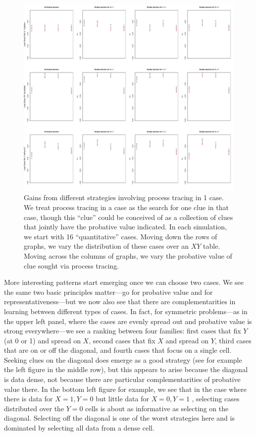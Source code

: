 \documentclass[12pt,]{book}
\begin{document}
\begin{figure}
\centering
\includegraphics{Figures/K1.pdf}
\caption{Gains from different strategies involving process tracing in 1 case. We treat process tracing in a case as the search for one clue in that case, though this ``clue'' could be conceived of as a collection of clues that jointly have the probative value indicated. In each simulation, we start with 16 ``quantitative'' cases. Moving down the rows of graphs, we vary the distribution of these cases over an \(XY\) table. Moving across the columns of graphs, we vary the probative value of clue sought via process tracing.}
\end{figure}

More interesting patterns start emerging once we can choose two cases. We see the same two basic principles matter---go for probative value and for representativeness---but we now also see that there are complementarities in learning between different types of cases. In fact, for symmetric problems---as in the upper left panel, where the cases are evenly spread out and probative value is strong everywhere---we see a ranking between four families: first cases that fix \(Y\) (at 0 or 1) and spread on \(X\), second cases that fix \(X\) and spread on \(Y\), third cases that are on or off the diagonal, and fourth cases that focus on a single cell. Seeking clues on the diagonal does emerge as a good strategy (see for example the left figure in the middle row), but this appears to arise because the diagonal is data dense, not because there are particular complementarities of probative value there. In the bottom left figure for example, we see that in the case where there is data for \(X=1, Y=0\) but little data for \(X=0, Y=1\) , selecting cases distributed over the \(Y=0\) cells is about as informative as selecting on the diagonal. Selecting off the diagonal is one of the worst strategies here and is dominated by selecting all data from a dense cell.
\end{document}
